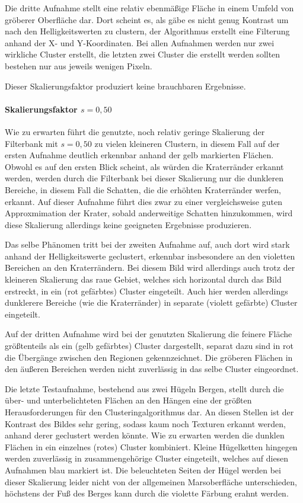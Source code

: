Die dritte Aufnahme stellt eine relativ ebenmäßige Fläche in einem Umfeld von gröberer Oberfläche dar. Dort scheint es, als gäbe es nicht genug Kontrast um nach den Helligkeitswerten zu clustern, der Algorithmus erstellt eine Filterung anhand der X- und Y-Koordinaten. Bei allen Aufnahmen werden nur zwei wirkliche Cluster erstellt, die letzten zwei Cluster die erstellt werden sollten bestehen nur aus jeweils wenigen Pixeln.

Dieser Skalierungsfaktor produziert keine brauchbaren Ergebnisse.

\paragraph{Skalierungsfaktor $s=0,50$}

Wie zu erwarten führt die genutzte, noch relativ geringe Skalierung der Filterbank mit $s=0,50$ zu vielen kleineren Clustern, in diesem Fall auf der ersten Aufnahme deutlich erkennbar anhand der gelb markierten Flächen. Obwohl es auf den ersten Blick scheint, als würden die Kraterränder erkannt werden, werden durch die Filterbank bei dieser Skalierung nur die dunkleren Bereiche, in diesem Fall die Schatten, die die erhöhten Kraterränder werfen, erkannt. Auf dieser Aufnahme führt dies zwar zu einer vergleichsweise guten Approxmimation der Krater, sobald anderweitige Schatten hinzukommen, wird diese Skalierung allerdings keine geeigneten Ergebnisse produzieren.

Das selbe Phänomen tritt bei der zweiten Aufnahme auf, auch dort wird stark anhand der Helligkeitswerte geclustert, erkennbar insbesondere an den violetten Bereichen an den Kraterrändern. Bei diesem Bild wird allerdings auch trotz der kleineren Skalierung das raue Gebiet, welches sich horizontal durch das Bild erstreckt, in ein (rot gefärbtes) Cluster eingeteilt. Auch hier werden allerdings dunklerere Bereiche (wie die Kraterränder) in separate (violett gefärbte) Cluster eingeteilt.

Auf der dritten Aufnahme wird bei der genutzten Skalierung die feinere Fläche größtenteils als ein (gelb gefärbtes) Cluster dargestellt, separat dazu sind in rot die Übergänge zwischen den Regionen gekennzeichnet. Die gröberen Flächen in den äußeren Bereichen werden nicht zuverlässig in das selbe Cluster eingeordnet.

Die letzte Testaufnahme, bestehend aus zwei Hügeln \bzw Bergen, stellt durch die über- und unterbelichteten Flächen an den Hängen eine der größten Herausforderungen für den Clusteringalgorithmus dar. An diesen Stellen ist der Kontrast des Bildes sehr gering, sodass kaum noch Texturen erkannt werden, anhand derer geclustert werden könnte. Wie zu erwarten werden die dunklen Flächen in ein einzelnes (rotes) Cluster kombiniert. Kleine Hügelketten hingegen werden zuverlässig in zusammengehörige Cluster eingeteilt, welches auf diesen Aufnahmen blau markiert ist. Die beleuchteten Seiten der Hügel werden bei dieser Skalierung leider nicht von der allgemeinen Marsoberfläche unterschieden, höchstens der Fuß des Berges kann durch die violette Färbung erahnt werden.

